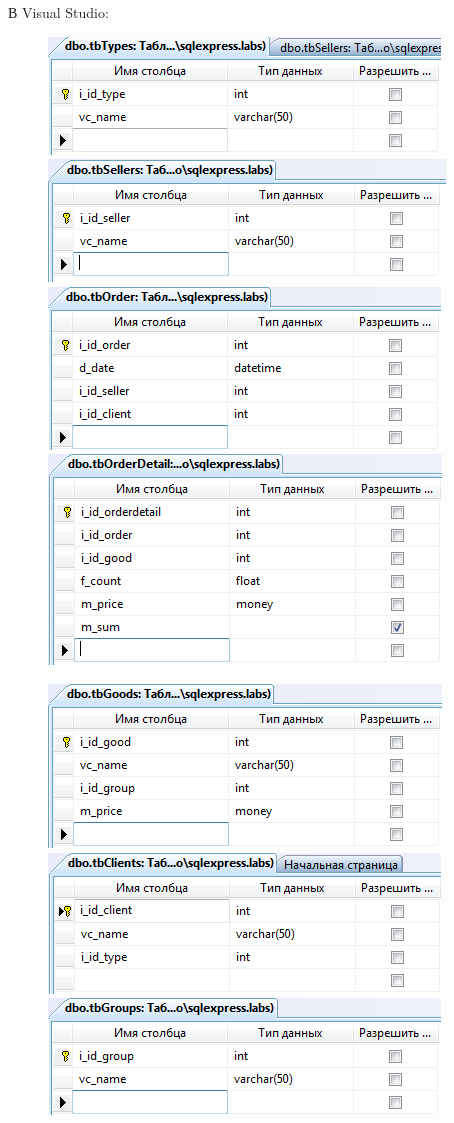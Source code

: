 \documentclass[pscyr]{hedlab}
\begin{document}
  В Visual Studio:
  \begin{figure}[h!]
    \center
    \includegraphics[width=.47\textwidth]{types_tab} \hspace{1em}
    \includegraphics[width=.47\textwidth]{sellers_tab} \\[.5em]
    \includegraphics[width=.47\textwidth]{order_tab} \hspace{1em}
    \includegraphics[width=.47\textwidth]{orderdetail_tab}
  \end{figure}
  
  \newpage
  
  \begin{figure}[h!]
    \center
    \includegraphics[width=.47\textwidth]{goods_tab} \hspace{1em}
    \includegraphics[width=.47\textwidth]{clients_tab} \\[.5em]
    \includegraphics[width=.47\textwidth]{groups_tab}
  \end{figure}
  
\end{document}
